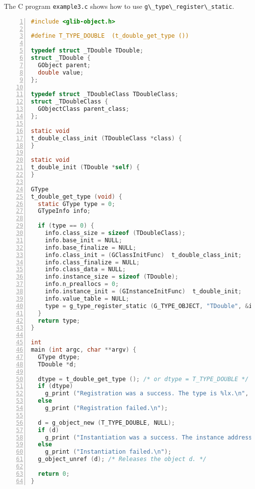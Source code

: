 The C program \passthrough{\lstinline!example3.c!} shows how to use
\passthrough{\lstinline!g\_type\_register\_static!}.

\begin{lstlisting}[language=C, numbers=left]
#include <glib-object.h>

#define T_TYPE_DOUBLE  (t_double_get_type ())

typedef struct _TDouble TDouble;
struct _TDouble {
  GObject parent;
  double value;
};

typedef struct _TDoubleClass TDoubleClass;
struct _TDoubleClass {
  GObjectClass parent_class;
};

static void
t_double_class_init (TDoubleClass *class) {
}

static void
t_double_init (TDouble *self) {
}

GType
t_double_get_type (void) {
  static GType type = 0;
  GTypeInfo info;

  if (type == 0) {
    info.class_size = sizeof (TDoubleClass);
    info.base_init = NULL;
    info.base_finalize = NULL;
    info.class_init = (GClassInitFunc)  t_double_class_init;
    info.class_finalize = NULL;
    info.class_data = NULL;
    info.instance_size = sizeof (TDouble);
    info.n_preallocs = 0;
    info.instance_init = (GInstanceInitFunc)  t_double_init;
    info.value_table = NULL;
    type = g_type_register_static (G_TYPE_OBJECT, "TDouble", &info, 0);
  }
  return type;
}

int
main (int argc, char **argv) {
  GType dtype;
  TDouble *d;

  dtype = t_double_get_type (); /* or dtype = T_TYPE_DOUBLE */
  if (dtype)
    g_print ("Registration was a success. The type is %lx.\n", dtype);
  else
    g_print ("Registration failed.\n");

  d = g_object_new (T_TYPE_DOUBLE, NULL);
  if (d)
    g_print ("Instantiation was a success. The instance address is %p.\n", d);
  else
    g_print ("Instantiation failed.\n");
  g_object_unref (d); /* Releases the object d. */

  return 0;
}
\end{lstlisting}

